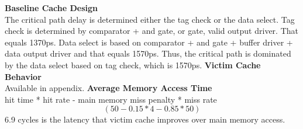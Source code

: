 \documentclass[11pt]{article}
\begin{document}

\begin{Parts}
	\Part \textbf{Baseline Cache Design} \\
		The critical path delay is determined either the tag check or the data select. Tag check is determined by comparator + and gate, or gate, valid output driver. That equals 1370ps. Data select is based on comparator + and gate + buffer driver + data output driver and that equals 1570ps. Thus, the critical path is dominated by the data select based on tag check, which is 1570ps.
	\Part \textbf{Victim Cache Behavior} \\
		Available in appendix.
	\Part \textbf{Average Memory Access Time} \\
	hit time * hit rate - main memory miss penalty * miss rate
	$$(50 - 0.15 * 4 - 0.85 * 50)$$
	6.9 cycles is the latency that victim cache improves over main memory access. 
\end{Parts}
\newpage
\end{document}
